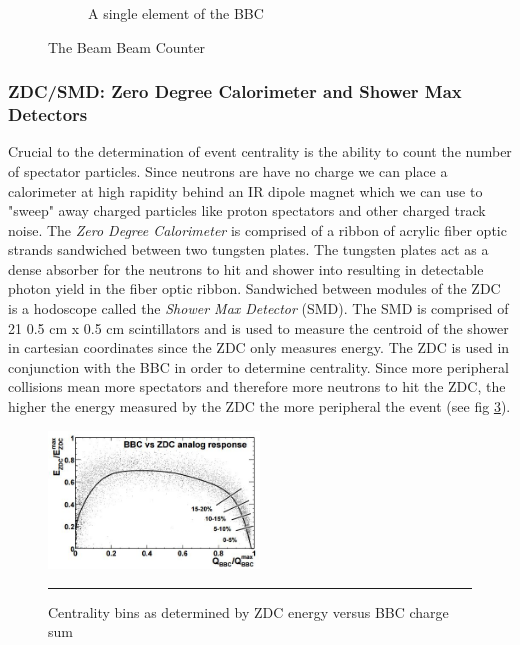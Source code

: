 \begin{figure}
\begin{subfigure}[b]{0.4\textwidth}
    \caption{A single element of the BBC}
    \label{fig:Rcpcentvsperiph}
\end{subfigure}
\caption[The Beam Beam Counter]{The Beam Beam Counter}
\label{fig:baryonenhancementAA}
\end{figure}

\subsubsection{ZDC/SMD: Zero Degree Calorimeter and Shower Max Detectors}
Crucial to the determination of event centrality is the ability to count the number of spectator particles. Since neutrons are have no charge we can place a calorimeter at high rapidity behind an IR dipole magnet which we can use to "sweep" away charged particles like proton spectators and other charged track noise. The \textit{Zero Degree Calorimeter}\citep{ZDCfocus} is comprised of a ribbon of acrylic fiber optic strands sandwiched between two tungsten plates. The tungsten plates act as a dense absorber for the neutrons to hit and shower into resulting in detectable photon yield in the fiber optic ribbon. Sandwiched between modules of the ZDC is a hodoscope called the \textit{Shower Max Detector} (SMD). The SMD is comprised of 21 0.5 cm x 0.5 cm scintillators and is used to measure the centroid of the shower in cartesian coordinates since the ZDC only measures energy\citep{phenixzdc}. The ZDC is used in conjunction with the BBC in order to determine centrality. Since more peripheral collisions mean more spectators and therefore more neutrons to hit the ZDC, the higher the energy measured by the ZDC the more peripheral the event (see fig \ref{fig:zdcvsbbc}\citep{Ghosh2001}).

\begin{figure}[h!]
  \centering
    \includegraphics[width=0.5\textwidth]{prevplots/bbczdcanaresponse.JPG}
    \rule{35em}{0.5pt}
  \caption[Centrality bins as determined by ZDC energy versus BBC charge sum]{Centrality bins as determined by ZDC energy versus BBC charge sum\citep{Ghosh2001}}
  \label{fig:zdcvsbbc}
\end{figure}

